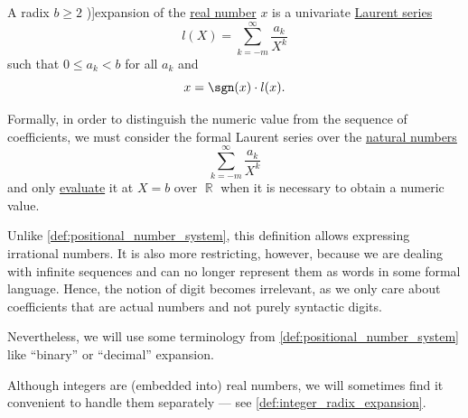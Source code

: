 \begin{definition}\label{def:real_number_radix_expansion}
  A radix \( b \geq 2 \) \term[en=expansion (\cite[260]{Rosen2019DiscreteMathematics})]{expansion} of the \hyperref[def:real_numbers]{real number} \( x \) is a univariate \hyperref[def:formal_laurent_series]{Laurent series}
  \begin{equation}\label{eq:def:positional_number_system/expansion}
    l(X) = \sum_{k=-m}^\infty \frac {a_k} {X^k}
  \end{equation}
  such that \( 0 \leq a_k < b \) for all \( a_k \) and
  \begin{equation*}
    x = \sgn(x) \cdot l(x).
  \end{equation*}
\end{definition}
\begin{comments}
  \item Formally, in order to distinguish the numeric value from the sequence of coefficients, we must consider the formal Laurent series over the \hyperref[def:natural_numbers]{natural numbers}
  \begin{equation*}
    \sum_{k=-m}^\infty \frac {a_k} {X^k}
  \end{equation*}
  and only \hyperref[con:free_construction/evaluation]{evaluate} it at \( X = b \) over \( \BbbR \) when it is necessary to obtain a numeric value.

  \item Unlike \cref{def:positional_number_system}, this definition allows expressing irrational numbers. It is also more restricting, however, because we are dealing with infinite sequences and can no longer represent them as words in some formal language. Hence, the notion of digit becomes irrelevant, as we only care about coefficients that are actual numbers and not purely syntactic digits.

  Nevertheless, we will use some terminology from \cref{def:positional_number_system} like \enquote{binary} or \enquote{decimal} expansion.

  \item Although integers are (embedded into) real numbers, we will sometimes find it convenient to handle them separately --- see \cref{def:integer_radix_expansion}.
\end{comments}

